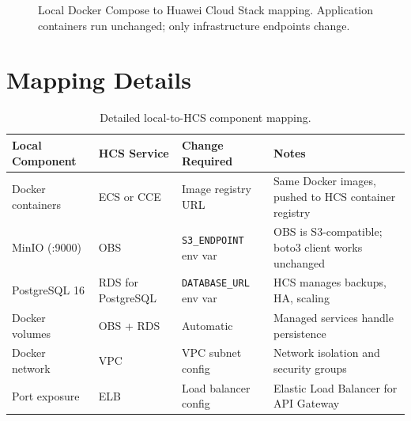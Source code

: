 \begin{figure}[H]
\caption{Local Docker Compose to Huawei Cloud Stack mapping. Application containers run unchanged; only infrastructure endpoints change.}
\label{fig:hcs-mapping}
\end{figure}

\section{Mapping Details}

\begin{table}[H]
\centering
\caption{Detailed local-to-HCS component mapping.}
\label{tab:hcs-mapping}
\begin{tabularx}{\textwidth}{@{}lllX@{}}
\toprule
\textbf{Local Component} & \textbf{HCS Service} & \textbf{Change Required} & \textbf{Notes} \\
\midrule
Docker containers & ECS or CCE & Image registry URL & Same Docker images, pushed to HCS container registry \\
MinIO (:9000) & OBS & \texttt{S3\_ENDPOINT} env var & OBS is S3-compatible; boto3 client works unchanged \\
PostgreSQL 16 & RDS for PostgreSQL & \texttt{DATABASE\_URL} env var & HCS manages backups, HA, scaling \\
Docker volumes & OBS + RDS & Automatic & Managed services handle persistence \\
Docker network & VPC & VPC subnet config & Network isolation and security groups \\
Port exposure & ELB & Load balancer config & Elastic Load Balancer for API Gateway \\
\bottomrule
\end{tabularx}
\end{table}

